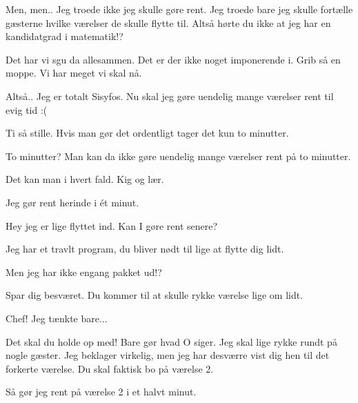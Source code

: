 \documentclass[a4paper,11pt]{article}
\begin{document}
\begin{sketch}

  Men, men.. Jeg troede ikke jeg skulle gøre rent. Jeg troede bare jeg skulle fortælle gæsterne hvilke værelser de skulle flytte til. Altså hørte du ikke at jeg har en kandidatgrad i matematik!?

 Det har vi sgu da allesammen. Det er der ikke noget imponerende i. Grib så en moppe. Vi har meget vi skal nå.

 Altså.. Jeg er totalt Sisyfos. Nu skal jeg gøre uendelig mange værelser rent til evig tid :(

 Ti så stille. Hvis man gør det ordentligt tager det kun to minutter.

 To minutter? Man kan da ikke gøre uendelig mange værelser rent på to minutter.

 Det kan man i hvert fald. Kig og lær.


 Jeg gør rent herinde i ét minut.


 Hey jeg er lige flyttet ind. Kan I gøre rent senere?

 Jeg har et travlt program, du bliver nødt til lige at flytte dig lidt.


 Men jeg har ikke engang pakket ud!?

 Spar dig besværet. Du kommer til at skulle rykke værelse lige om lidt.


 Chef! Jeg tænkte bare...

 Det skal du holde op med! Bare gør hvad O siger. Jeg skal lige rykke rundt på nogle gæster.  Jeg beklager virkelig, men jeg har desværre vist dig hen til det forkerte værelse. Du skal faktisk bo på værelse 2.


 Så gør jeg rent på værelse 2 i et halvt minut.



\end{sketch}
\end{document}
